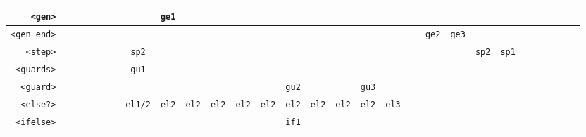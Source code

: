 \documentclass[11pt,a4paper]{article}
\newcommand*\id[1]{\texttt{#1}}
\begin{document}
\begin{table}[H]
\begin{adjustbox}{width=\textwidth}
\begin{tabular}{|r||c|c|c|c|c|c|c|c|c|c|c|c|c|c|c|c|c|c|c|c|c|c|c|c|}
        \id{<gen>}           & \id{   }                 & \id{   }    & \id{   }  & \id{   }  & \id{   }   & \id{ge1}   & \id{   }    & \id{   }  & \id{   }  & \id{   }     & \id{   } & \id{   }    & \id{   }  & \id{   }     & \id{   }   & \id{   } & \id{   } & \id{   }    & \id{   } & \id{   } & \id{   } & \id{   } & \id{   } & \id{   } \\ \hline
        \id{<gen\_end>}      & \id{   }                 & \id{   }    & \id{   }  & \id{   }  & \id{   }   & \id{   }   & \id{   }    & \id{   }  & \id{   }  & \id{   }     & \id{   } & \id{   }    & \id{   }  & \id{   }     & \id{   }   & \id{   } & \id{ge2} & \id{ge3}    & \id{   } & \id{   } & \id{   } & \id{   } & \id{   } & \id{   } \\ \hline
        \id{<step>}          & \id{   }                 & \id{   }    & \id{   }  & \id{   }  & \id{sp2}   & \id{   }   & \id{   }    & \id{   }  & \id{   }  & \id{   }     & \id{   } & \id{   }    & \id{   }  & \id{   }     & \id{   }   & \id{   } & \id{   } & \id{   }    & \id{sp2} & \id{sp1} & \id{   } & \id{   } & \id{   } & \id{   } \\ \hline
        \id{<guards>}        & \id{   }                 & \id{   }    & \id{   }  & \id{   }  & \id{gu1}   & \id{   }   & \id{   }    & \id{   }  & \id{   }  & \id{   }     & \id{   } & \id{   }    & \id{   }  & \id{   }     & \id{   }   & \id{   } & \id{   } & \id{   }    & \id{   } & \id{   } & \id{   } & \id{   } & \id{   } & \id{   } \\ \hline
        \id{<guard>}         & \id{   }                 & \id{   }    & \id{   }  & \id{   }  & \id{   }   & \id{   }   & \id{   }    & \id{   }  & \id{   }  & \id{   }     & \id{gu2} & \id{   }    & \id{   }  & \id{gu3}     & \id{   }   & \id{   } & \id{   } & \id{   }    & \id{   } & \id{   } & \id{   } & \id{   } & \id{   } & \id{   } \\ \hline
        \id{<else?>}         & \id{   }                 & \id{   }    & \id{   }  & \id{   }  & \id{el1/2} & \id{el2}   & \id{el2}    & \id{el2}  & \id{el2}  & \id{el2}     & \id{el2} & \id{el2}    & \id{el2}  & \id{el2}     & \id{el3}   & \id{   } & \id{   } & \id{   }    & \id{   } & \id{   } & \id{   } & \id{   } & \id{   } & \id{   } \\ \hline
        \id{<ifelse>}        & \id{   }                 & \id{   }    & \id{   }  & \id{   }  & \id{   }   & \id{   }   & \id{   }    & \id{   }  & \id{   }  & \id{   }     & \id{if1} & \id{   }    & \id{   }  & \id{   }     & \id{   }   & \id{   } & \id{   } & \id{   }    & \id{   } & \id{   } & \id{   } & \id{   } & \id{   } & \id{   } \\ \hline

\end{tabular}
\end{adjustbox}
\end{table}
\end{document}
